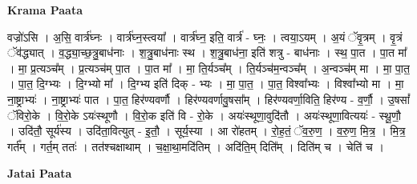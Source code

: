 \documentclass[17pt]{extarticle}
\begin{document}
\textbf{Krama Paata} \newline

वज्रो॑ऽसि । अ॒सि॒ वार्त्र॑घ्नः । वार्त्र॑घ्न॒स्त्वया᳚ । वार्त्र॑घ्न॒ इति॒ वार्त्र॑ - घ्नः॒ । त्वया॒ऽयम् । अ॒यं ॅवृ॒त्रम् । वृ॒त्रं ॅव॑द्ध्यात् । व॒द्ध्या॒च्छ॒त्रु॒बाध॑नाः । श॒त्रु॒बाध॑नाः स्थ । श॒त्रु॒बाध॑ना॒ इति॑ शत्रु - बाध॑नाः । स्थ॒ पा॒त । पा॒त मा᳚ । मा॒ प्र॒त्यञ्च᳚म् । प्र॒त्यञ्च॑म् पा॒त । पा॒त मा᳚ । मा॒ ति॒र्यञ्च᳚म् । ति॒र्यञ्च॑म॒न्वञ्च᳚म् । अ॒न्वञ्च॑म् मा । मा॒ पा॒त॒ । पा॒त॒ दि॒ग्भ्यः । दि॒ग्भ्यो मा᳚ । दि॒ग्भ्य इति॑ दिक् - भ्यः । मा॒ पा॒त॒ । पा॒त॒ विश्वा᳚भ्यः । विश्वा᳚भ्यो मा । मा॒ ना॒ष्ट्राभ्यः॑ । ना॒ष्ट्राभ्यः॑ पात । पा॒त॒ हिर॑ण्यवर्णौ । हिर॑ण्यवर्णावु॒षसा᳚म् । हिर॑ण्यवर्णा॒विति॒ हिर॑ण्य - व॒र्णौ॒ । उ॒षसां᳚ ॅविरो॒के । वि॒रो॒के ऽयः॑स्थूणौ । वि॒रो॒क इति॑ वि - रो॒के । अयः॑स्थूणा॒वुदि॑तौ । अयः॑स्थूणा॒वित्ययः॑ - स्थू॒णौ॒ । उदि॑तौ॒ सूर्य॑स्य । उदि॑ता॒वित्युत् - इ॒तौ॒ । सूर्य॒स्या । आ रो॑हतम् । रो॒ह॒तं॒ ॅव॒रु॒ण॒ । व॒रु॒ण॒ मि॒त्र॒ । मि॒त्र॒ गर्त᳚म् । गर्त॒म् ततः॑ । तत॑श्चक्षाथाम् । च॒क्षा॒था॒मदि॑तिम् । अदि॑ति॒म् दिति᳚म् । दिति॑म् च । चेति॑ च । \newline

\textbf{Jatai Paata} \newline
\end{document}
